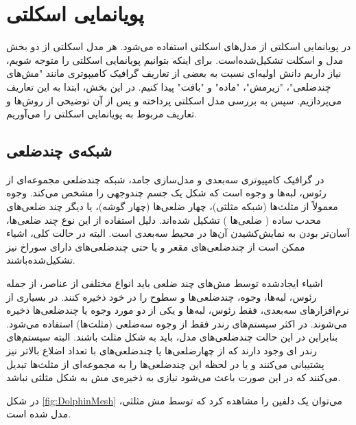 






\section{ پویانمایی اسکلتی}

در پویانمایی اسکلتی از مدل‌های اسکلتی استفاده می‌شود. هر مدل اسکلتی از دو بخش مدل و اسکلت تشکیل‌شده‌است. 
برای اینکه بتوانیم پویانمایی اسکلتی را متوجه شویم، نیاز داریم دانش اولیه‌ای نسبت به بعضی 
از تعاریف گرافیک کامیپوتری مانند "مش‌های چندضلعی"، "زیرمش"، "ماده" و "بافت" پیدا کنیم.
در این بخش، ابتدا به این تعاریف می‌پردازیم.
سپس به بررسی مدل اسکلتی پرداخته و پس از آن توضیحی از روش‌ها و تعاریف 
مربوط به پویانمایی اسکلتی را می‌آوریم.


\subsection{شبکه‌ی\protect{} چندضلعی}

در گرافیک کامپیوتری سه‌بعدی و مدل‌سازی جامد، شبکه چند‌ضلعی مجموعه‌ای از رئوس، لبه‌ها و وجوه است که شکل یک جسم چند‌وجهی را مشخص می‌کند.
وجوه معمولاً از مثلث‌ها (شبکه مثلثی)، چهار ضلعی‌ها (چهار گوشه)، یا دیگر چند ضلعی‌های محدب ساده
(
	ضلعی‌ها
)
تشکیل شده‌اند. دلیل استفاده از این نوع چند ضلعی‌ها، آسان‌تر بودن به نمایش‌کشیدن آن‌ها در محیط سه‌بعدی است.
البته در حالت کلی، اشیاء ممکن است از چندضلعی‌های مقعر و یا حتی چندضلعی‌های دارای سوراخ نیز تشکیل‌شده‌باشند.

اشیاء ایجادشده توسط مش‌های چند ضلعی باید انواع مختلفی از عناصر، از جمله رئوس، لبه‌ها، وجوه، چندضلعی‌ها و سطوح را در خود ذخیره کنند.
در بسیاری از نرم‌افزارهای سه‌بعدی، فقط رئوس، لبه‌ها و یکی از دو مورد وجوه یا چند‌ضلعی‌ها ذخیره می‌شوند.
در اکثر سیستم‌های رندر
فقط از وجوه سه‌ضلعی
(مثلث‌ها)
استفاده‌ می‌شود.
بنابراین در این حالت چند‌ضلعی‌های مدل، باید به شکل مثلث باشند. البته سیستم‌های رندر‌ ای وجود دارند که از چهارضلعی‌ها یا چندضلعی‌های با تعداد اضلاع بالاتر نیز پشتیبانی ‌می‌کنند و یا در لحظه این چندضلعی‌ها را به مجموعه‌ای از مثلث‌ها تبدیل می‌کنند که در این صورت باعث ‌می‌شود نیازی به ذخیره‌ی مش به شکل مثلثی نباشد.

در شکل 
\ref{fig:DolphinMesh}
می‌توان یک دلفین را مشاهده کرد که توسط مش مثلثی، مدل شده است.

